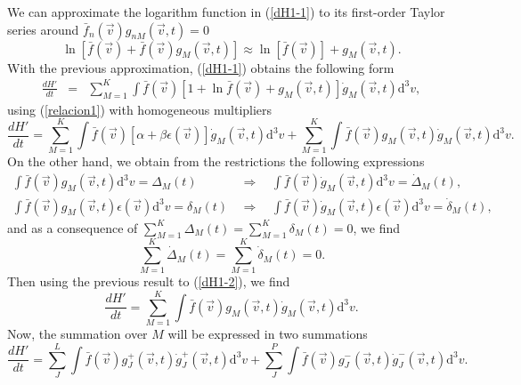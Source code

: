 We can approximate the logarithm function in (\ref{dH1-1}) to its first-order
Taylor series around $\bar f_n(\vec{v}) g_{nM}(\vec{v},t)=0$ 
%
\begin{equation}\label{lnapproximationclassical}
    \ln [\bar{f}(\vec{v})+\bar{f}(\vec{v}) g_{M}(\vec{v},t)] \approx
    \ln [\bar{f}(\vec{v})]+ g_{M}(\vec{v},t).
\end{equation}
%
With the previous approximation, (\ref{dH1-1}) obtains the following form 
%
\begin{eqnarray}
    \frac{dH'}{dt}&=&\sum_{M=1}^{K} \int \bar f(\vec{v})\left[
      1+\ln \bar f(\vec{v})+g_M(\vec{v},t)
    \right]\dot g_M(\vec{v},t)\mathrm{d}^3v,
\end{eqnarray}
%
using (\ref{relacion1}) with homogeneous multipliers
%
\begin{equation}\label{dH1-2}
    \frac{dH'}{dt} = \sum_{M=1}^{K}\int\bar f(\vec{v})\left[
      \alpha+\beta \epsilon(\vec{v})
    \right]\dot g_M(\vec{v},t)\mathrm{d}^3v +\sum_{M=1}^{K}
    \int\bar f(\vec{v})g_M(\vec{v},t)\dot g_M(\vec{v},t)\mathrm{d}^3v . \nonumber 
\end{equation}
%
On the other hand, we obtain from the restrictions the following expressions
%
\begin{eqnarray}
    \int \bar{f}(\vec{v}) g_{M}(\vec{v},t) \mathrm{d}^{3}v=\Delta_M(t) \ \  &\Rightarrow&
    \ \  \int \bar{f}(\vec{v}) \dot{g}_{M}(\vec{v},t)\mathrm{d}^{3}v=\dot{\Delta}_M(t), \nonumber \\
    \int  \bar{f}(\vec{v}) g_{M}(\vec{v},t)\epsilon(\vec{v}) \mathrm{d}^{3}v=\delta_M(t) \ \  &\Rightarrow&
    \ \  \int \bar{f}(\vec{v}) \dot{g}_{M}(\vec{v},t)\epsilon(\vec{v}) \mathrm{d}^{3}v=\dot{\delta}_M(t), \nonumber 
\end{eqnarray}
%
and as a consequence of $\sum_{M=1}^{K} \Delta_M(t) =\sum_{M=1}^{K} \delta_M(t) =0$,
we find
%
\begin{equation}
    \sum_{M=1}^{K} \dot{\Delta}_M(t)  =\sum_{M=1}^{K} \dot{\delta}_{M}(t) =0.
\end{equation}
%
Then using the previous result to (\ref{dH1-2}), we find
%
\begin{equation}
  \frac{dH'}{dt} = \sum_{M=1}^{K}\int\bar f(\vec{v})g_M(\vec{v},t)\dot g_M(\vec{v},t)\mathrm{d}^3v.
\end{equation}
%
Now, the summation over $M$ will be expressed in two summations
%
\begin{equation}\label{classicalH3}
    \frac{dH'}{dt}=\sum_J^{L}\int
      \bar f(\vec{v})g_J^{+}(\vec{v},t)\dot g_J^{+}(\vec{v},t)\mathrm{d}^3v
      +\sum_J^{P}\int
        \bar f(\vec{v})g_J^{-}(\vec{v},t)\dot g_J^{-}(\vec{v},t)\mathrm{d}^3v.
\end{equation}
